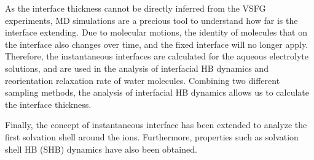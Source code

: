 As the interface thickness cannot be directly inferred from the VSFG experiments,
MD simulations are a precious tool to understand how far is the interface extending.
Due to molecular motions, the identity of molecules that on the interface also changes over time\cite{Willard2010}, 
and the fixed interface will no longer apply. 
Therefore, the instantaneous interfaces are calculated for the aqueous electrolyte solutions, and are used in the analysis of interfacial HB dynamics
and reorientation relaxation rate of water molecules.
Combining two different sampling methods, the analysis of interfacial HB dynamics allows us to calculate the interface thickness.

Finally, the concept of instantaneous interface 
has been extended to analyze the first solvation shell around the ions.
Furthermore, properties such as solvation shell HB (SHB) dynamics have also been obtained.

